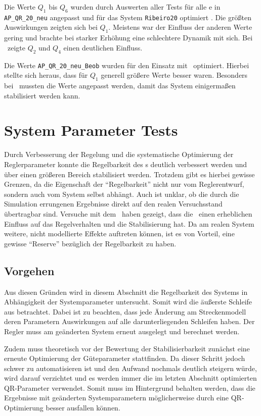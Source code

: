 Die Werte $Q_1$ bis $Q_6$ wurden durch Auswerten aller Tests für alle \ap e in \texttt{AP\_QR\_20\_neu} angepasst und für das System \texttt{Ribeiro20} optimiert .
Die größten Auswirkungen zeigten sich bei $Q_1$. 
Meistens war der Einfluss der anderen Werte gering und brachte bei starker Erhöhung eine schlechtere Dynamik mit sich.
Bei \apv\ zeigte $Q_2$ und $Q_4$ einen deutlichen Einfluss.

Die Werte \texttt{AP\_QR\_20\_neu\_Beob} wurden für den Einsatz mit \beob\ optimiert.
Hierbei stellte sich heraus, dass für $Q_1$ generell größere Werte besser waren.
Besonders bei \apv\ mussten die Werte angepasst werden, damit das System einigermaßen stabilisiert werden kann.




\section{System Parameter Tests}\label{sec:x0sys}

Durch Verbesserung der Regelung und die systematische Optimierung der Reglerparameter konnte die Regelbarkeit des \dpd s deutlich verbessert werden und über einen größeren Bereich stabilisiert werden.
Trotzdem gibt es hierbei gewisse Grenzen, da die Eigenschaft der "`Regelbarkeit"' nicht nur vom Reglerentwurf, sondern auch vom System selbst abhängt.
Auch ist unklar, ob die durch die Simulation errungenen Ergebnisse direkt auf den realen Versuchsstand übertragbar sind.
Versuche mit dem \beob\ haben gezeigt, dass die \ze\ einen erheblichen Einfluss auf das Regelverhalten und die Stabilisierung hat.
Da am realen System weitere, nicht modellierte Effekte auftreten können, ist es von Vorteil, eine gewisse "`Reserve"' bezüglich der Regelbarkeit zu haben.


\subsection{Vorgehen}

Aus diesen Gründen wird in diesem Abschnitt die Regelbarkeit des Systems in Abhängigkeit der Systemparameter untersucht.
Somit wird die äußerste Schleife aus  betrachtet.
Dabei ist zu beachten, dass jede Änderung am Streckenmodell \bzw deren Parametern Auswirkungen auf alle darunterliegenden Schleifen haben.
Der Regler muss am geänderten System erneut ausgelegt und berechnet werden.

Zudem muss theoretisch vor der Bewertung der Stabilisierbarkeit zunächst eine erneute Optimierung der Güteparameter stattfinden.
Da dieser Schritt jedoch schwer zu automatisieren ist und den Aufwand nochmals deutlich steigern würde, wird darauf verzichtet und es werden immer die im letzten Abschnitt optimierten QR-Parameter verwendet.
Somit muss im Hintergrund behalten werden, dass die Ergebnisse mit geänderten Systemparametern möglicherweise durch eine QR-Optimierung besser ausfallen können.


